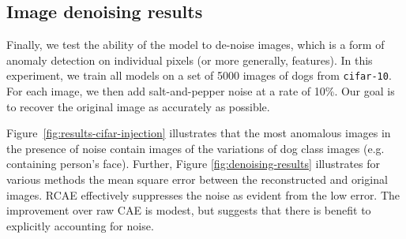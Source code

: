 \begin{table}[!t]
	\centering
	\renewcommand{\arraystretch}{1.25}
	\caption{Inductive anomaly detection results on {\tt cifar-10}. Note that RPCA and DRMF are inapplicable here. Highlighted cells indicate best performer.}
	\label{tbl:inductive-anomaly-results}
\end{table}


\subsection{Image denoising results}

Finally, we test the ability of the model to de-noise images, which is a form of anomaly detection on individual pixels (or more generally, features).
In this experiment, we train all models on a set of 5000 images of dogs from {\tt cifar-10}.
For each image, we then add salt-and-pepper noise at a rate of 10\%.
Our goal is to recover the original image as accurately as possible.

Figure~\ref{fig:results-cifar-injection} illustrates that the most anomalous images in the presence of noise
contain images of the variations of dog class images (e.g. containing person's face).
Further, Figure \ref{fig:denoising-results} illustrates for various methods the mean square error between the reconstructed and original images.
RCAE effectively suppresses the noise as evident from the low error.
The improvement over raw CAE is modest, but suggests that there is benefit to explicitly accounting for noise.

